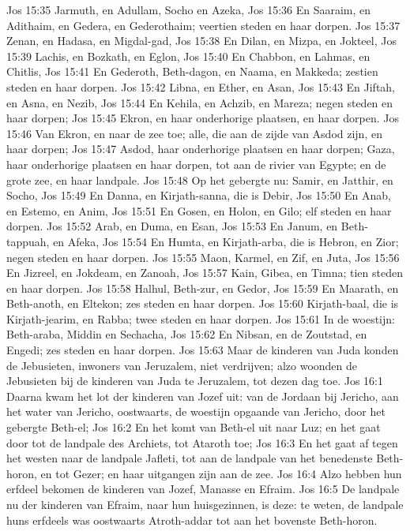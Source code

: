 Jos 15:35  Jarmuth, en Adullam, Socho en Azeka,
Jos 15:36  En Saaraim, en Adithaim, en Gedera, en Gederothaim; veertien steden en haar dorpen.
Jos 15:37  Zenan, en Hadasa, en Migdal-gad,
Jos 15:38  En Dilan, en Mizpa, en Jokteel,
Jos 15:39  Lachis, en Bozkath, en Eglon,
Jos 15:40  En Chabbon, en Lahmas, en Chitlis,
Jos 15:41  En Gederoth, Beth-dagon, en Naama, en Makkeda; zestien steden en haar dorpen.
Jos 15:42  Libna, en Ether, en Asan,
Jos 15:43  En Jiftah, en Asna, en Nezib,
Jos 15:44  En Kehila, en Achzib, en Mareza; negen steden en haar dorpen;
Jos 15:45  Ekron, en haar onderhorige plaatsen, en haar dorpen.
Jos 15:46  Van Ekron, en naar de zee toe; alle, die aan de zijde van Asdod zijn, en haar dorpen;
Jos 15:47  Asdod, haar onderhorige plaatsen en haar dorpen; Gaza, haar onderhorige plaatsen en haar dorpen, tot aan de rivier van Egypte; en de grote zee, en haar landpale.
Jos 15:48  Op het gebergte nu: Samir, en Jatthir, en Socho,
Jos 15:49  En Danna, en Kirjath-sanna, die is Debir,
Jos 15:50  En Anab, en Estemo, en Anim,
Jos 15:51  En Gosen, en Holon, en Gilo; elf steden en haar dorpen.
Jos 15:52  Arab, en Duma, en Esan,
Jos 15:53  En Janum, en Beth-tappuah, en Afeka,
Jos 15:54  En Humta, en Kirjath-arba, die is Hebron, en Zior; negen steden en haar dorpen.
Jos 15:55  Maon, Karmel, en Zif, en Juta,
Jos 15:56  En Jizreel, en Jokdeam, en Zanoah,
Jos 15:57  Kain, Gibea, en Timna; tien steden en haar dorpen.
Jos 15:58  Halhul, Beth-zur, en Gedor,
Jos 15:59  En Maarath, en Beth-anoth, en Eltekon; zes steden en haar dorpen.
Jos 15:60  Kirjath-baal, die is Kirjath-jearim, en Rabba; twee steden en haar dorpen.
Jos 15:61  In de woestijn: Beth-araba, Middin en Sechacha,
Jos 15:62  En Nibsan, en de Zoutstad, en Engedi; zes steden en haar dorpen.
Jos 15:63  Maar de kinderen van Juda konden de Jebusieten, inwoners van Jeruzalem, niet verdrijven; alzo woonden de Jebusieten bij de kinderen van Juda te Jeruzalem, tot dezen dag toe.
Jos 16:1  Daarna kwam het lot der kinderen van Jozef uit: van de Jordaan bij Jericho, aan het water van Jericho, oostwaarts, de woestijn opgaande van Jericho, door het gebergte Beth-el;
Jos 16:2  En het komt van Beth-el uit naar Luz; en het gaat door tot de landpale des Archiets, tot Ataroth toe;
Jos 16:3  En het gaat af tegen het westen naar de landpale Jafleti, tot aan de landpale van het benedenste Beth-horon, en tot Gezer; en haar uitgangen zijn aan de zee.
Jos 16:4  Alzo hebben hun erfdeel bekomen de kinderen van Jozef, Manasse en Efraim.
Jos 16:5  De landpale nu der kinderen van Efraim, naar hun huisgezinnen, is deze: te weten, de landpale huns erfdeels was oostwaarts Atroth-addar tot aan het bovenste Beth-horon.
